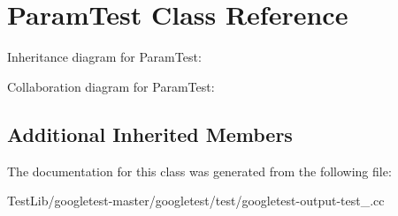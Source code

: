 \hypertarget{classParamTest}{}\section{Param\+Test Class Reference}
\label{classParamTest}


Inheritance diagram for Param\+Test\+:


Collaboration diagram for Param\+Test\+:
\subsection*{Additional Inherited Members}


The documentation for this class was generated from the following file\+:\begin{DoxyCompactItemize}
\item 
Test\+Lib/googletest-\/master/googletest/test/googletest-\/output-\/test\+\_\+.\+cc\end{DoxyCompactItemize}
